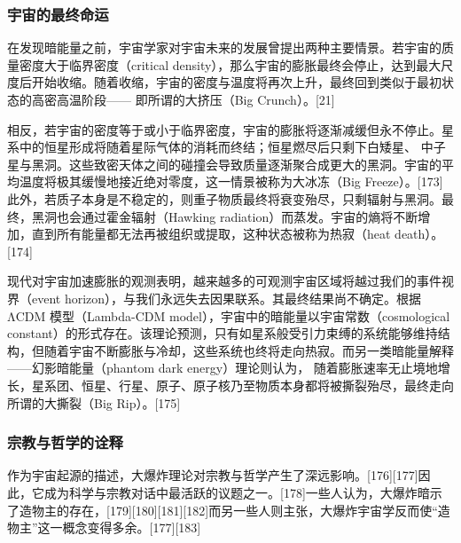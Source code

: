 \subsubsection{宇宙的最终命运}  
在发现暗能量之前，宇宙学家对宇宙未来的发展曾提出两种主要情景。若宇宙的质量密度大于临界密度（critical density），那么宇宙的膨胀最终会停止，达到最大尺度后开始收缩。随着收缩，宇宙的密度与温度将再次上升，最终回到类似于最初状态的高密高温阶段—— 即所谓的大挤压（Big Crunch）。[21]

相反，若宇宙的密度等于或小于临界密度，宇宙的膨胀将逐渐减缓但永不停止。星系中的恒星形成将随着星际气体的消耗而终结；恒星燃尽后只剩下白矮星、 中子星与黑洞。这些致密天体之间的碰撞会导致质量逐渐聚合成更大的黑洞。宇宙的平均温度将极其缓慢地接近绝对零度，这一情景被称为大冰冻（Big Freeze）。[173]此外，若质子本身是不稳定的，则重子物质最终将衰变殆尽，只剩辐射与黑洞。最终，黑洞也会通过霍金辐射（Hawking radiation）而蒸发。宇宙的熵将不断增加，直到所有能量都无法再被组织或提取，这种状态被称为热寂（heat death）。[174]

现代对宇宙加速膨胀的观测表明，越来越多的可观测宇宙区域将越过我们的事件视界（event horizon），与我们永远失去因果联系。其最终结果尚不确定。根据ΛCDM 模型（Lambda-CDM model），宇宙中的暗能量以宇宙常数（cosmological constant）的形式存在。该理论预测，只有如星系般受引力束缚的系统能够维持结构，但随着宇宙不断膨胀与冷却，这些系统也终将走向热寂。而另一类暗能量解释——幻影暗能量（phantom dark energy）理论则认为，  随着膨胀速率无止境地增长，星系团、恒星、行星、原子、原子核乃至物质本身都将被撕裂殆尽，最终走向所谓的大撕裂（Big Rip）。[175]
\subsubsection{宗教与哲学的诠释 }
作为宇宙起源的描述，大爆炸理论对宗教与哲学产生了深远影响。[176][177]因此，它成为科学与宗教对话中最活跃的议题之一。[178]一些人认为，大爆炸暗示了造物主的存在，[179][180][181][182]而另一些人则主张，大爆炸宇宙学反而使“造物主”这一概念变得多余。[177][183]
